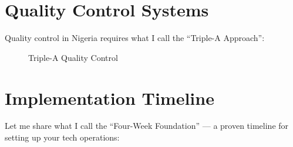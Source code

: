 \section{Quality Control Systems}\label{sec:quality-control}

Quality control in Nigeria requires what I call the ``Triple-A Approach'':

\begin{figure}[h]
    \centering
    \caption{Triple-A Quality Control}
    \label{fig:quality-control}
\end{figure}

\section{Implementation Timeline}\label{sec:implementation-timeline}

Let me share what I call the ``Four-Week Foundation'' --- a proven timeline for setting up your tech operations:


